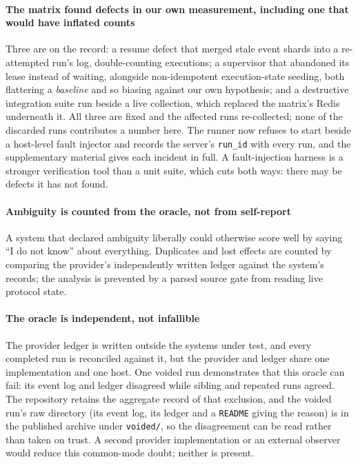 \paragraph{The matrix found defects in our own measurement, including one that
would have inflated counts} Three are on the record: a resume defect that
merged stale event shards into a re-attempted run's log, double-counting
executions; a supervisor that abandoned its lease instead of waiting, alongside
non-idempotent execution-state seeding, both flattering a \emph{baseline} and
so biasing against our own hypothesis; and a destructive integration suite run
beside a live collection, which replaced the matrix's Redis underneath it. All
three are fixed and the affected runs re-collected; none of the discarded runs
contributes a number here. The runner now refuses to start beside a host-level
fault injector and records the server's \texttt{run\_id} with every run, and
the supplementary material gives each incident in full. A fault-injection
harness is a stronger verification tool than a unit suite, which cuts both
ways: there may be defects it has not found.

\paragraph{Ambiguity is counted from the oracle, not from self-report} A system
that declared ambiguity liberally could otherwise score well by saying ``I do
not know'' about everything. Duplicates and lost effects are counted by
comparing the provider's independently written ledger against the system's
records; the analysis is prevented by a parsed source gate from reading live
protocol state.

\paragraph{The oracle is independent, not infallible} The provider ledger is
written outside the systems under test, and every completed run is reconciled
against it, but the provider and ledger share one implementation and one host.
One voided run demonstrates that this oracle can fail: its event log and ledger
disagreed while sibling and repeated runs agreed. The repository retains the
aggregate record of that exclusion, and the voided run's raw directory (its
event log, its ledger and a \texttt{README} giving the reason) is in the
published archive under \texttt{voided/}, so the disagreement can be read
rather than taken on trust. A second provider
implementation or an external observer would reduce this common-mode doubt;
neither is present.

